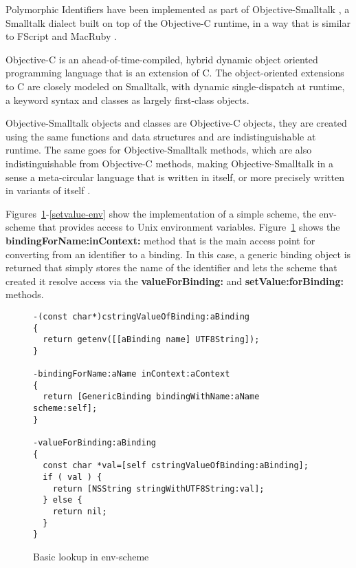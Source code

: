 \documentclass[preprint,authoryear]{acm_proc_article-sp}
\begin{document}
Polymorphic Identifiers have been implemented as part of Objective-Smalltalk \cite{objst},
a Smalltalk dialect built on top of the Objective-C\cite{objc-evol}\cite{objc-apple} runtime, 
in a way that is similar to FScript\cite{fscript} and MacRuby \cite{macruby}.

Objective-C is an ahead-of-time-compiled, hybrid dynamic object oriented programming language
that is an extension of C.  The object-oriented extensions to C are closely modeled on
Smalltalk, with dynamic single-dispatch at runtime, a keyword syntax and classes as
largely first-class objects.

Objective-Smalltalk objects and classes are Objective-C objects, they are created using
the same functions and data structures and are indistinguishable at runtime.
The same goes for Objective-Smalltalk methods, which are also indistinguishable from
Objective-C methods, making Objective-Smalltalk in a sense a meta-circular language
that is written in itself, or more precisely written in variants of itself \cite{kleinvm}\cite{squeak}.

Figures~\ref{get-env}-\ref{setvalue-env} show the implementation of a simple scheme,
the env-scheme that provides access to Unix environment variables.  Figure~\ref{get-env}
shows the {\bf bindingForName:inContext:} method that is the main access point for
converting from an identifier to a binding.  In this case, a generic binding object is returned
that simply stores the name of the identifier and lets the scheme that created it resolve
access via the {\bf valueForBinding:} and {\bf setValue:forBinding:} methods.



\begin{figure}[htbp]
\begin{center}
\begin{verbatim}
-(const char*)cstringValueOfBinding:aBinding
{
  return getenv([[aBinding name] UTF8String]);
}

-bindingForName:aName inContext:aContext
{
  return [GenericBinding bindingWithName:aName scheme:self];
}

-valueForBinding:aBinding
{
  const char *val=[self cstringValueOfBinding:aBinding];
  if ( val ) {
    return [NSString stringWithUTF8String:val];
  } else {
    return nil;
  }
}
\end{verbatim}
\caption{Basic lookup in env-scheme}
\label{get-env}
\end{center}
\end{figure}
\end{document}
